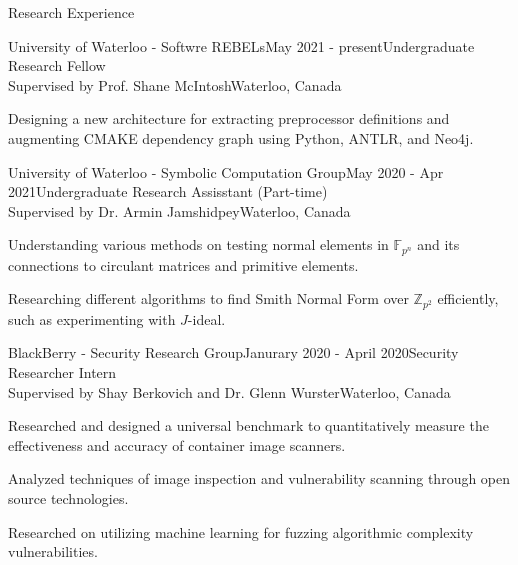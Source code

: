 \documentclass{cv}
\begin{document}
\begin{rSection}{Research Experience}
\begin{rSubsection}{University of Waterloo - Softwre REBELs}{May 2021 - present}{Undergraduate Research Fellow \\ Supervised by Prof. Shane McIntosh}{Waterloo, Canada}
	\item Designing a new architecture for extracting preprocessor definitions and augmenting CMAKE dependency graph
	using Python, ANTLR, and Neo4j.
\end{rSubsection}

\begin{rSubsection}{University of Waterloo - Symbolic Computation Group}{May 2020 - Apr 2021}{Undergraduate Research Assisstant (Part-time)\\ Supervised by Dr. Armin Jamshidpey}{Waterloo, Canada}
    \item Understanding various methods on testing normal elements in $\mathbb{F}_{p^n}$ and its connections to circulant matrices and primitive elements.
  	\item Researching different algorithms to find Smith Normal Form over $\mathbb{Z}_{p^2}$ efficiently, such as experimenting with $J$-ideal.
\end{rSubsection}

\begin{rSubsection}{BlackBerry - Security Research Group}{Janurary 2020 - April 2020}{Security Researcher Intern \\ Supervised by Shay Berkovich and Dr. Glenn Wurster}{Waterloo, Canada}
	\item Researched and designed a universal benchmark to quantitatively measure the effectiveness and accuracy of container image scanners.
	\item Analyzed techniques of image inspection and vulnerability scanning through open source technologies.
	\item Researched on utilizing machine learning for fuzzing algorithmic complexity vulnerabilities.
\end{rSubsection}
\end{rSection}
\end{document}
